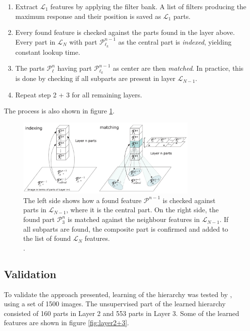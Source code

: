 \begin{enumerate}
	\item Extract $\mathcal{L}_1$ features by applying the filter bank.
A list of filters producing the maximum response and their position is saved as $\mathcal{L}_1$ parts. 
	\item Every found feature is checked against the parts found in the layer above. 
	Every part in $\mathcal{L}_{N}$  with part $\mathcal{P}_{\ell_k}^{n-1}$ as the central part is \textit{indexed},
yielding constant lookup time. 
	\item The parts $\mathcal{P}_{\ell}^{n}$ having part $\mathcal{P}_{\ell_k}^{n-1}$ as center
are then \textit{matched}. In practice, this is done by checking if all subparts are present in layer $\mathcal{L}_{N-1}$.
	\item Repeat step 2 + 3 for all remaining layers.  
\end{enumerate}

The process is also shown in figure \ref{fig:indexing-matching}. 
\begin{figure}[h!] %
\centering
\includegraphics[width=0.8\textwidth]{graphics/indexing-matching}
\caption[Indexing and matching]{The left side shows how a found feature $\mathcal{P}^{n-1}$ is checked against
parts in $\mathcal{L}_{N-1}$, where it is the central part. 
On the right side, the found part $\mathcal{P}_{3}^{n}$ is matched against the neighbour features in $\mathcal{L}_{N-1}$. 
If all subparts are found, the composite part is confirmed and added to the list of found $\mathcal{L}_{N}$ features. \\
\citep[fig.~3]{fidler2009learning}.}
\label{fig:indexing-matching}
\end{figure}

\subsection{Validation}
\label{sec:fidler-results}
To validate the approach presented, learning of the hierarchy was tested by \citet{fidler2009learning},
using a set of 1500 images. 
The unsupervised part of the learned hierarchy consisted of 160 parts in Layer 2 and 553 parts in Layer 3. 
Some of the learned features are shown in figure \ref{fig:layer2+3}.

